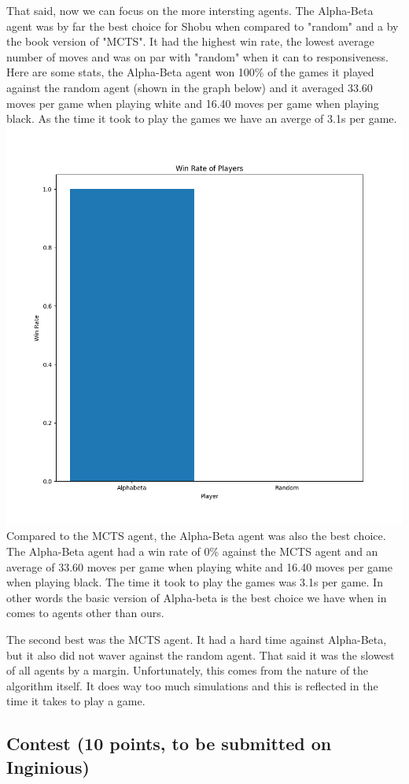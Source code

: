 \documentclass[11pt,a4paper]{report}
\begin{document}
\begin{answers}[20cm]
    That said, now we can focus on the more intersting agents. The Alpha-Beta agent was by far the best choice for Shobu when compared to 
    "random" and a by the book version of "MCTS". It had the highest win rate, the lowest average number of moves and was on par with 
    "random" when it can to responsiveness. 
    Here are some stats, the Alpha-Beta agent won 100\% of the games it played against the random agent (shown in the graph below) and it averaged 
    33.60 moves per game when playing white and 16.40 moves per game when playing black. As the time it took to play the games we have an averge of 3.1s per game.
    \includegraphics[scale=.29]{graphs/abvsrand.png}
    Compared to the MCTS agent, the Alpha-Beta agent was also the best choice. The Alpha-Beta agent had a win rate of 0\% against the MCTS agent and an average of
    33.60 moves per game when playing white and 16.40 moves per game when playing black. The time it took to play the games was 3.1s per game. In other words the basic 
    version of Alpha-beta is the best choice we have when in comes to agents other than ours.

    The second best was the MCTS agent. It had a hard time against Alpha-Beta, but it also did not waver against the random agent. That said it was the slowest of all agents by a margin. 
    Unfortunately, this comes from the nature of the algorithm itself. It does way too much simulations and this is reflected in the time it takes to play a game. 
\end{answers}

\begin{answers}[23cm]
\end{answers}

\begin{answers}[23cm]
\end{answers}


\subsection{Contest (10 points, to be submitted on Inginious)}
\end{document}
